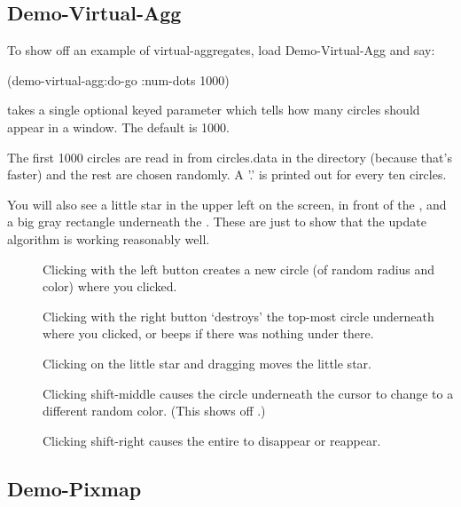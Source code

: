 \subsection{Demo-Virtual-Agg}

To show off an example of virtual-aggregates, load Demo-Virtual-Agg and say:

\begin{programexample}
(demo-virtual-agg:do-go :num-dots 1000)
\end{programexample}

 takes a single optional keyed parameter
 which tells how many circles should appear in a window.
The default is 1000.

The first 1000 circles are read in from circles.data in the
 directory (because that's
faster) and the rest are chosen randomly.  A '.' is printed out for
every ten circles.

You will also see a little star in the upper left on the screen, in front
of the , and a big gray rectangle underneath the
.  These are just to show that the update
algorithm is working reasonably well.

\begin{description}
\item[] Clicking with the left button creates a new circle (of random radius and
    color) where you clicked.

\item[] Clicking with the right button `destroys' the top-most circle underneath
    where you clicked, or beeps if there was nothing under there.

\item[] Clicking on the little star and dragging moves the little star.

\item[] Clicking shift-middle causes the circle underneath the cursor to change
to a different random color. (This shows off .)

\item[] Clicking shift-right causes the entire 
to disappear or reappear.
\end{description}


\subsection{Demo-Pixmap}

